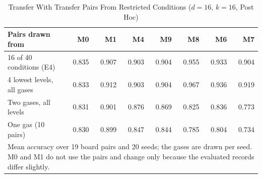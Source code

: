\begin{table}[t]
\caption{Transfer With Transfer Pairs From Restricted Conditions ($d=16$, $k=16$, Post Hoc)}
\label{tab:conc}\centering\scriptsize\setlength{\tabcolsep}{2.2pt}
\begin{tabular}{l rrrrrrr}\toprule
Pairs drawn from & M0 & M1 & M4 & M9 & M8 & M6 & M7\\\midrule
16 of 40 conditions (E4) & 0.835 & 0.907 & 0.903 & 0.904 & 0.955 & 0.933 & 0.904\\
4 lowest levels, all gases & 0.833 & 0.912 & 0.903 & 0.904 & 0.967 & 0.936 & 0.919\\
Two gases, all levels & 0.831 & 0.901 & 0.876 & 0.869 & 0.825 & 0.836 & 0.773\\
One gas (10 pairs) & 0.830 & 0.899 & 0.847 & 0.844 & 0.785 & 0.804 & 0.734\\
\bottomrule
\multicolumn{8}{p{0.95\columnwidth}}{\scriptsize Mean accuracy over 19 board pairs and 20 seeds; the gases are drawn per seed. M0 and M1 do not use the pairs and change only because the evaluated records differ slightly.}
\end{tabular}
\end{table}
